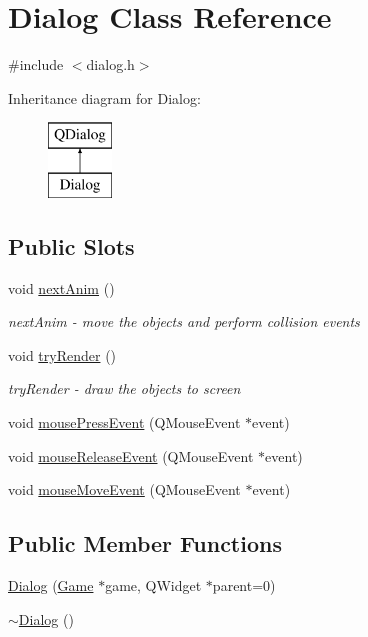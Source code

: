 \hypertarget{class_dialog}{}\section{Dialog Class Reference}
\label{class_dialog}


{\ttfamily \#include $<$dialog.\+h$>$}

Inheritance diagram for Dialog\+:\begin{figure}[H]
\begin{center}
\leavevmode
\includegraphics[height=2.000000cm]{class_dialog}
\end{center}
\end{figure}
\subsection*{Public Slots}
\begin{DoxyCompactItemize}
\item 
void \mbox{\hyperlink{class_dialog_a45158754d3f4531b29a0f50abde94597}{next\+Anim}} ()
\begin{DoxyCompactList}\small\item\em next\+Anim -\/ move the objects and perform collision events \end{DoxyCompactList}\item 
void \mbox{\hyperlink{class_dialog_aa887f720e12758049bb9f1f1814759da}{try\+Render}} ()
\begin{DoxyCompactList}\small\item\em try\+Render -\/ draw the objects to screen \end{DoxyCompactList}\item 
void \mbox{\hyperlink{class_dialog_a95aaa4d78bda5c07650d383d3c5292ac}{mouse\+Press\+Event}} (Q\+Mouse\+Event $\ast$event)
\item 
void \mbox{\hyperlink{class_dialog_a95158bddb719a98816c8432ddb096b27}{mouse\+Release\+Event}} (Q\+Mouse\+Event $\ast$event)
\item 
void \mbox{\hyperlink{class_dialog_aea6bb029efbb1eaa374bd938ff0afabf}{mouse\+Move\+Event}} (Q\+Mouse\+Event $\ast$event)
\end{DoxyCompactItemize}
\subsection*{Public Member Functions}
\begin{DoxyCompactItemize}
\item 
\mbox{\hyperlink{class_dialog_a50ae9716ee548a6f31fc5d0a29347899}{Dialog}} (\mbox{\hyperlink{class_game}{Game}} $\ast$game, Q\+Widget $\ast$parent=0)
\item 
\mbox{\hyperlink{class_dialog_a2a1fe6ef28513eed13bfcd3a4da83ccb}{$\sim$\+Dialog}} ()
\end{DoxyCompactItemize}
